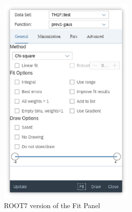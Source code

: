 \documentclass[a4paper]{jpconf}
\begin{document}
\begin{figure}[h]
  \centering
\begin{minipage}{14pc}
\includegraphics[width=16pc]{rfitpanel1.eps}
\caption{\label{label}ROOT7 version of the Fit Panel}
\end{minipage}\hspace{2pc}%
\begin{minipage}{14pc}

\end{minipage}
\end{figure}
\end{document}
